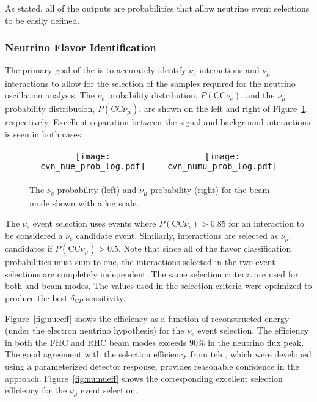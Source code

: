 As stated, all of the outputs are probabilities that allow neutrino event selections to be easily defined.

\subsubsection{Neutrino Flavor Identification}
The primary goal of the  is to accurately identify $\nu_e$ interactions and $\nu_\mu$ interactions to allow for the selection of the samples required for the neutrino oscillation analysis. The $\nu_e$ probability distribution, $P(\textrm{CC}\nu_e)$, and the $\nu_\mu$ probability distribution, $P(\textrm{CC}\nu_\mu)$, are shown on the left and right of Figure~\ref{fig:cvnprob}, respectively. Excellent separation between the signal and background interactions is seen in both cases.

\begin{figure}
    \centering
    \begin{tabular}{cc}
		\texttt{[image: cvn\_nue\_prob\_log.pdf]} &
		\texttt{[image: cvn\_numu\_prob\_log.pdf]} 
	\end{tabular}
	\caption{The  $\nu_e$ probability (left) and $\nu_\mu$ probability (right) for the  beam mode shown with a log scale.}
    \label{fig:cvnprob}
\end{figure}

The $\nu_e$ event selection uses events where $P(\textrm{CC}\nu_e) > 0.85$ for an interaction to be considered a $\nu_e$ candidate event. Similarly, interactions are selected as $\nu_\mu$ candidates if $P(\textrm{CC}\nu_\mu) > 0.5$. Note that since all of the flavor classification probabilities must sum to one, the interactions selected in the two event selections are completely independent. The same selection criteria are used for both  and  beam modes. The values used in the selection criteria were optimized to produce the best $\delta_{CP}$ sensitivity.

Figure~\ref{fig:nueeff} shows the efficiency as a function of reconstructed energy (under the electron neutrino hypothesis) for the $\nu_e$ event selection. The efficiency in both the FHC and RHC beam modes exceeds 90\% in the neutrino flux peak. The good agreement with the selection efficiency from teh  , which were developed using a parameterized detector response, provides reasonable confidence in the  approach. Figure~\ref{fig:numueff} shows the corresponding excellent selection efficiency for the $\nu_\mu$ event selection.

